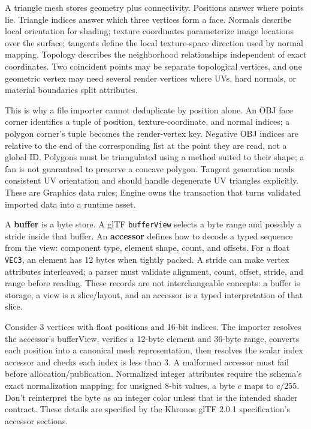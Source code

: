 A triangle mesh stores geometry plus connectivity. Positions answer where points lie. Triangle indices answer which three vertices form a face. Normals describe local orientation for shading; texture coordinates parameterize image locations over the surface; tangents define the local texture-space direction used by normal mapping. Topology describes the neighborhood relationships independent of exact coordinates. Two coincident points may be separate topological vertices, and one geometric vertex may need several render vertices where UVs, hard normals, or material boundaries split attributes.

This is why a file importer cannot deduplicate by position alone. An OBJ face corner identifies a tuple of position, texture-coordinate, and normal indices; a polygon corner's tuple becomes the render-vertex key. Negative OBJ indices are relative to the end of the corresponding list at the point they are read, not a global ID. Polygons must be triangulated using a method suited to their shape; a fan is not guaranteed to preserve a concave polygon. Tangent generation needs consistent UV orientation and should handle degenerate UV triangles explicitly. These are Graphics data rules; Engine owns the transaction that turns validated imported data into a runtime asset.

A \textbf{buffer} is a byte store. A glTF \texttt{bufferView} selects a byte range and possibly a stride inside that buffer. An \textbf{accessor} defines how to decode a typed sequence from the view: component type, element shape, count, and offsets. For a float \texttt{VEC3}, an element has 12 bytes when tightly packed. A stride can make vertex attributes interleaved; a parser must validate alignment, count, offset, stride, and range before reading. These records are not interchangeable concepts: a buffer is storage, a view is a slice/layout, and an accessor is a typed interpretation of that slice.

Consider 3 vertices with float positions and 16-bit indices. The importer resolves the accessor's bufferView, verifies a 12-byte element and 36-byte range, converts each position into a canonical mesh representation, then resolves the scalar index accessor and checks each index is less than 3. A malformed accessor must fail before allocation/publication. Normalized integer attributes require the schema's exact normalization mapping; for unsigned 8-bit values, a byte \(c\) maps to \(c/255\). Don't reinterpret the byte as an integer color unless that is the intended shader contract. These details are specified by the Khronos glTF 2.0.1 specification's accessor sections.

